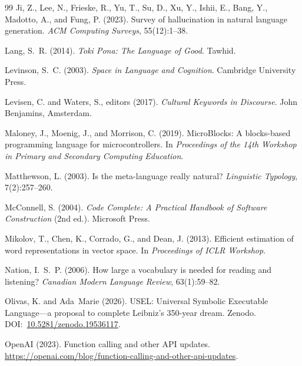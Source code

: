 \documentclass[11pt,a4paper]{article}
\begin{document}
\begin{thebibliography}{99}
Ji, Z., Lee, N., Frieske, R., Yu, T., Su, D., Xu, Y., Ishii, E., Bang, Y., Madotto, A., and Fung, P. (2023).
\newblock Survey of hallucination in natural language generation.
\newblock \emph{ACM Computing Surveys}, 55(12):1--38.

Lang, S.~R. (2014).
\newblock \emph{Toki Pona: The Language of Good}.
\newblock Tawhid.

Levinson, S.~C. (2003).
\newblock \emph{Space in Language and Cognition}.
\newblock Cambridge University Press.

Levisen, C. and Waters, S., editors (2017).
\newblock \emph{Cultural Keywords in Discourse}.
\newblock John Benjamins, Amsterdam.

Maloney, J., Moenig, J., and Morrison, C. (2019).
\newblock MicroBlocks: A blocks-based programming language for microcontrollers.
\newblock In \emph{Proceedings of the 14th Workshop in Primary and Secondary Computing Education}.

Matthewson, L. (2003).
\newblock Is the meta-language really natural?
\newblock \emph{Linguistic Typology}, 7(2):257--260.

McConnell, S. (2004).
\newblock \emph{Code Complete: A Practical Handbook of Software Construction} (2nd ed.).
\newblock Microsoft Press.

Mikolov, T., Chen, K., Corrado, G., and Dean, J. (2013).
\newblock Efficient estimation of word representations in vector space.
\newblock In \emph{Proceedings of ICLR Workshop}.

Nation, I.~S.~P. (2006).
\newblock How large a vocabulary is needed for reading and listening?
\newblock \emph{Canadian Modern Language Review}, 63(1):59--82.

Olivas, K. and Ada~Marie (2026).
\newblock USEL: Universal Symbolic Executable Language---a proposal to complete Leibniz's 350-year dream.
\newblock Zenodo. DOI:~\href{https://doi.org/10.5281/zenodo.19536117}{10.5281/zenodo.19536117}.

OpenAI (2023).
\newblock Function calling and other API updates.
\newblock \url{https://openai.com/blog/function-calling-and-other-api-updates}.


\end{thebibliography}
\end{document}
